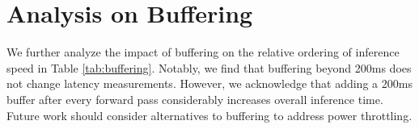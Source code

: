 \section{Analysis on Buffering}
\label{appendix:throtting}

We further analyze the impact of buffering on the relative ordering of inference speed in Table \ref{tab:buffering}. Notably, we find that buffering beyond 200ms does not change latency measurements. However, we acknowledge that adding a 200ms buffer after every forward pass considerably increases overall inference time. Future work should consider alternatives to buffering to address power throttling.


{
\setlength{\tabcolsep}{2.6em}
\begin{table}[h]
\centering
\caption{\textbf{Analysis on Buffering.} We evaluate models with different amounts of buffering between consecutive forward passes. We find that buffering beyond 200ms does not provide any additional stability to latency measurements.}
\label{tab:buffering}
\end{table}
}

